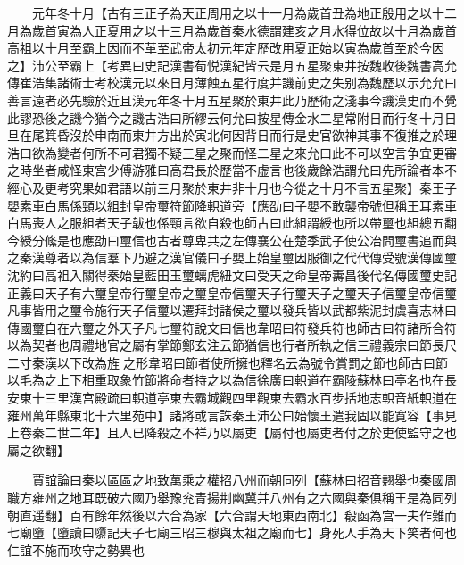 　　元年冬十月【古有三正子為天正周用之以十一月為歲首丑為地正殷用之以十二月為歲首寅為人正夏用之以十三月為歲首秦水德謂建亥之月水得位故以十月為歲首高祖以十月至霸上因而不革至武帝太初元年定歷改用夏正始以寅為歲首至於今因之】沛公至霸上【考異曰史記漢書荀悦漢紀皆云是月五星聚東井按魏收後魏書高允傳崔浩集諸術士考校漢元以來日月薄蝕五星行度并譏前史之失别為魏歷以示允允曰善言遠者必先驗於近且漢元年冬十月五星聚於東井此乃歷術之淺事今譏漢史而不覺此謬恐後之譏今猶今之譏古浩曰所繆云何允曰按星傳金水二星常附日而行冬十月日旦在尾箕昏沒於申南而東井方出於寅北何因背日而行是史官欲神其事不復推之於理浩曰欲為變者何所不可君獨不疑三星之聚而怪二星之來允曰此不可以空言争宜更審之時坐者咸怪東宫少傅游雅曰高君長於歷當不虚言也後歲餘浩謂允曰先所論者本不經心及更考究果如君語以前三月聚於東井非十月也今從之十月不言五星聚】秦王子嬰素車白馬係頸以組封皇帝璽符節降軹道旁【應劭曰子嬰不敢襲帝號但稱王耳素車白馬喪人之服組者天子韍也係頸言欲自殺也師古曰此組謂綬也所以帶璽也組總五翻今綬分絛是也應劭曰璽信也古者尊卑共之左傳襄公在楚季武子使公冶問璽書追而與之秦漢尊者以為信羣下乃避之漢官儀曰子嬰上始皇璽因服御之代代傳受號漢傳國璽沈約曰高祖入關得秦始皇藍田玉璽螭虎紐文曰受天之命皇帝夀昌後代名傳國璽史記正義曰天子有六璽皇帝行璽皇帝之璽皇帝信璽天子行璽天子之璽天子信璽皇帝信璽凡事皆用之璽令施行天子信璽以遷拜封諸侯之璽以發兵皆以武都紫泥封虞喜志林曰傳國璽自在六璽之外天子凡七璽符說文曰信也韋昭曰符發兵符也師古曰符諸所合符以為契者也周禮地官之屬有掌節鄭玄注云節猶信也行者所執之信三禮義宗曰節長尺二寸秦漢以下改為旌之形韋昭曰節者使所擁也釋名云為號令賞罰之節也師古曰節以毛為之上下相重取象竹節將命者持之以為信徐廣曰軹道在霸陵蘇林曰亭名也在長安東十三里漢宫殿疏曰軹道亭東去霸城觀四里觀東去霸水百步括地志軹音紙軹道在雍州萬年縣東北十六里苑中】諸將或言誅秦王沛公曰始懷王遣我固以能寛容【事見上卷秦二世二年】且人已降殺之不祥乃以屬吏【屬付也屬吏者付之於吏使監守之也屬之欲翻】

　　賈誼論曰秦以區區之地致萬乘之權招八州而朝同列【蘇林曰招音翹舉也秦國周職方雍州之地耳既破六國乃舉豫兖青揚荆幽冀并八州有之六國與秦俱稱王是為同列朝直遥翻】百有餘年然後以六合為家【六合謂天地東西南北】殽函為宫一夫作難而七廟墮【墮讀曰隳記天子七廟三昭三穆與太祖之廟而七】身死人手為天下笑者何也仁誼不施而攻守之勢異也

